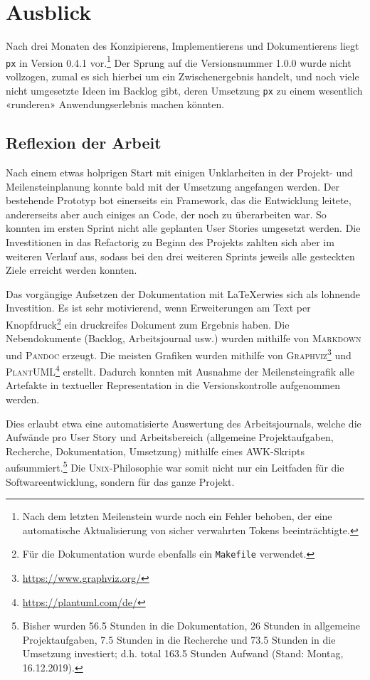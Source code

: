 \section{Ausblick}

Nach drei Monaten des Konzipierens, Implementierens und Dokumentierens liegt \texttt{px} in Version 0.4.1 vor.\footnote{Nach dem letzten Meilenstein wurde noch ein Fehler behoben, der eine automatische Aktualisierung von sicher verwahrten Tokens beeinträchtigte.} Der Sprung auf die Versionsnummer 1.0.0 wurde nicht vollzogen, zumal es sich hierbei um ein Zwischenergebnis handelt, und noch viele nicht umgesetzte Ideen im Backlog gibt, deren Umsetzung \texttt{px} zu einem wesentlich «runderen» Anwendungserlebnis machen könnten.

\subsection{Reflexion der Arbeit}

Nach einem etwas holprigen Start mit einigen Unklarheiten in der Projekt- und Meilensteinplanung konnte bald mit der Umsetzung angefangen werden. Der bestehende Prototyp bot einerseits ein Framework, das die Entwicklung leitete, andererseits aber auch einiges an Code, der noch zu überarbeiten war. So konnten im ersten Sprint nicht alle geplanten User Stories umgesetzt werden. Die Investitionen in das Refactorig zu Beginn des Projekts zahlten sich aber im weiteren Verlauf aus, sodass bei den drei weiteren Sprints jeweils alle gesteckten Ziele erreicht werden konnten.

Das vorgängige Aufsetzen der Dokumentation mit \LaTeX erwies sich als lohnende Investition. Es ist sehr motivierend, wenn Erweiterungen am Text per Knopfdruck\footnote{Für die Dokumentation wurde ebenfalls ein \texttt{Makefile} verwendet.} ein druckreifes Dokument zum Ergebnis haben. Die Nebendokumente (Backlog, Arbeitsjournal usw.) wurden mithilfe von \textsc{Markdown} und \textsc{Pandoc} erzeugt. Die meisten Grafiken wurden mithilfe von \textsc{Graphviz}\footnote{\url{https://www.graphviz.org/}} und \textsc{PlantUML}\footnote{\url{https://plantuml.com/de/}} erstellt. Dadurch konnten mit Ausnahme der Meilensteingrafik alle Artefakte in textueller Representation in die Versionskontrolle aufgenommen werden.

Dies erlaubt etwa eine automatisierte Auswertung des Arbeitsjournals, welche die Aufwände pro User Story und Arbeitsbereich (allgemeine Projektaufgaben, Recherche, Dokumentation, Umsetzung) mithilfe eines \textsc{AWK}-Skripts aufsummiert.\footnote{Bisher wurden 56.5 Stunden in die Dokumentation, 26 Stunden in allgemeine Projektaufgaben, 7.5 Stunden in die Recherche und 73.5 Stunden in die Umsetzung investiert; d.h. total 163.5 Stunden Aufwand (Stand: Montag, 16.12.2019).} Die \textsc{Unix}-Philoso\-phie war somit nicht nur ein Leitfaden für die Softwareentwicklung, sondern für das ganze Projekt.

